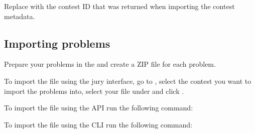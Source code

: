 \documentclass[a4paper,10pt,english,openany]{sphinxmanual}
\begin{document}
\sphinxAtStartPar
Replace  with the contest ID that was returned when importing the
contest metadata.


\subsection{Importing problems}
\label{\detokenize{import:importing-problems}}
\sphinxAtStartPar
Prepare your problems in the {\hyperref[\detokenize{problem-format::doc}]{}} and
create a ZIP file for each problem.

\sphinxAtStartPar
To import the file using the jury interface, go to , select the contest
you want to import the problems into, select your file under 
and click .

\sphinxAtStartPar
To import the file using the API run the following command:

\begin{sphinxVerbatim}[commandchars=\\\{\}]
       
\end{sphinxVerbatim}

\sphinxAtStartPar
To import the file using the CLI run the following command:

\begin{sphinxVerbatim}[commandchars=\\\{\}]
        
\end{sphinxVerbatim}
\end{document}
